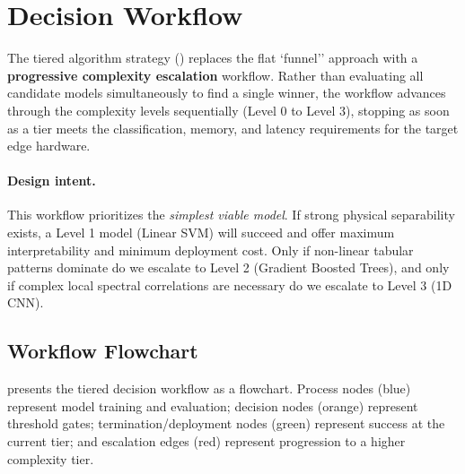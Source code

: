 
\section{Decision Workflow}\label{sec:workflow}

The tiered algorithm strategy () replaces the flat 
`funnel'' approach with a \textbf{progressive complexity escalation} workflow. 
Rather than evaluating all candidate models simultaneously to find a single winner, 
the workflow advances through the complexity levels sequentially (Level 0 to Level 3), 
stopping as soon as a tier meets the classification, memory, and latency requirements 
for the target edge hardware.

\paragraph{Design intent.}
This workflow prioritizes the \emph{simplest viable model}. If strong physical separability 
exists, a Level 1 model (Linear SVM) will succeed and offer maximum interpretability 
and minimum deployment cost. Only if non-linear tabular patterns dominate do we escalate 
to Level 2 (Gradient Boosted Trees), and only if complex local spectral correlations 
are necessary do we escalate to Level 3 (1D CNN).

\subsection{Workflow Flowchart}
\label{subsec:flowchart}

 presents the tiered decision workflow as a flowchart.
Process nodes (blue) represent model training and evaluation; decision nodes (orange) 
represent threshold gates; termination/deployment nodes (green) represent success at 
the current tier; and escalation edges (red) represent progression to a higher complexity tier.

